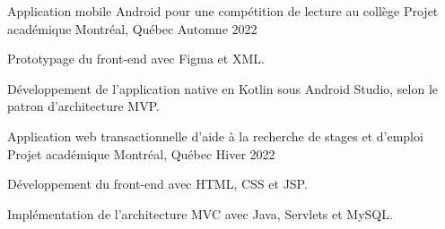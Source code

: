
\begin{cventries}
	
	\cventry
	{Application mobile Android pour une compétition de lecture au collège} %
	{Projet académique} %
	{Montréal, Québec} %
	{Automne 2022} %
	{
		\begin{cvitems} %
			\item {Prototypage du front-end avec Figma et XML.}
			\item {Développement de l’application native en Kotlin sous Android Studio, selon le patron d’architecture MVP.}
		\end{cvitems}
	}
	
	\cventry
	{Application web transactionnelle d’aide à la recherche de stages et d’emploi} %
	{Projet académique} %
	{Montréal, Québec} %
	{Hiver 2022} %
	{
		\begin{cvitems}
			\item {Développement du front-end avec HTML, CSS et JSP.}
			\item {Implémentation de l’architecture MVC avec Java, Servlets et MySQL.}
		\end{cvitems}
	}
	
\end{cventries}
